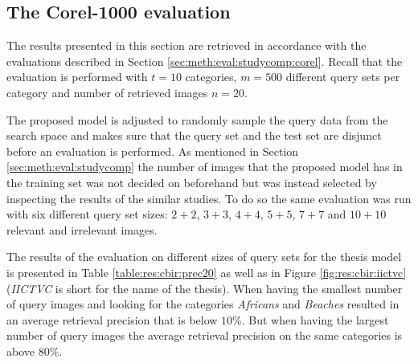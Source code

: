 \subsection{The Corel-1000 evaluation}
\label{sec:res:studycomp:corel}
The results presented in this section are retrieved in accordance with the evaluations described in Section \ref{sec:meth:eval:studycomp:corel}. Recall that the evaluation is performed with $t=10$ categories, $m=500$ different query sets per category and number of retrieved images $n=20$.

The proposed model is adjusted to randomly sample the query data from the search space and makes sure that the query set and the test set are disjunct before an evaluation is performed. As mentioned in Section \ref{sec:meth:eval:studycomp} the number of images that the proposed model has in the training set was not decided on beforehand but was instead selected by inspecting the results of the similar studies. To do so the same evaluation was run with six different query set sizes: $2+2$, $3+3$, $4+4$, $5+5$, $7+7$ and $10+10$ relevant and irrelevant images. 


The results of the evaluation on different sizes of query sets for the thesis model is presented in Table \ref{table:res:cbir:prec20} as well as in Figure \ref{fig:res:cbir:iictvc} (\emph{IICTVC} is short for the name of the thesis). When having the smallest number of query images and looking for the categories \emph{Africans} and \emph{Beaches} resulted in an average retrieval precision that is below $10\%$. But when having the largest number of query images the average retrieval precision on the same categories is above $80\%$.


